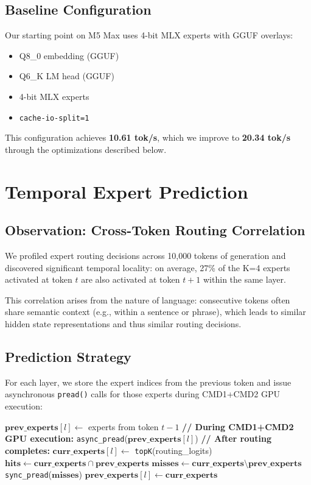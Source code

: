 \documentclass[11pt,twocolumn]{article}
\begin{document}
\subsection{Baseline Configuration}

Our starting point on M5 Max uses 4-bit MLX experts with GGUF overlays:
\begin{itemize}
    \item Q8\_0 embedding (GGUF)
    \item Q6\_K LM head (GGUF)
    \item 4-bit MLX experts
    \item \texttt{cache-io-split=1}
\end{itemize}

This configuration achieves \textbf{10.61 tok/s}, which we improve to \textbf{20.34 tok/s} through the optimizations described below.

\section{Temporal Expert Prediction}

\subsection{Observation: Cross-Token Routing Correlation}

We profiled expert routing decisions across 10,000 tokens of generation and discovered significant temporal locality: on average, 27\% of the K=4 experts activated at token $t$ are also activated at token $t+1$ within the same layer.

This correlation arises from the nature of language: consecutive tokens often share semantic context (e.g., within a sentence or phrase), which leads to similar hidden state representations and thus similar routing decisions.

\subsection{Prediction Strategy}

For each layer, we store the expert indices from the previous token and issue asynchronous \texttt{pread()} calls for those experts during CMD1+CMD2 GPU execution:

\begin{algorithm}
\caption{Temporal Expert Prediction}
\begin{algorithmic}[1]
\State $\mathbf{prev\_experts}[l] \gets$ experts from token $t-1$
    \State \textbf{// During CMD1+CMD2 GPU execution:}
    \State \texttt{async\_pread}($\mathbf{prev\_experts}[l]$)
    \State \textbf{// After routing completes:}
    \State $\mathbf{curr\_experts}[l] \gets$ \texttt{topK}(routing\_logits)
    \State $\mathbf{hits} \gets \mathbf{curr\_experts} \cap \mathbf{prev\_experts}$
    \State $\mathbf{misses} \gets \mathbf{curr\_experts} \setminus \mathbf{prev\_experts}$
    \State \texttt{sync\_pread}($\mathbf{misses}$) 
    \State $\mathbf{prev\_experts}[l] \gets \mathbf{curr\_experts}$
\EndFor
\end{algorithmic}
\end{algorithm}
\end{document}
